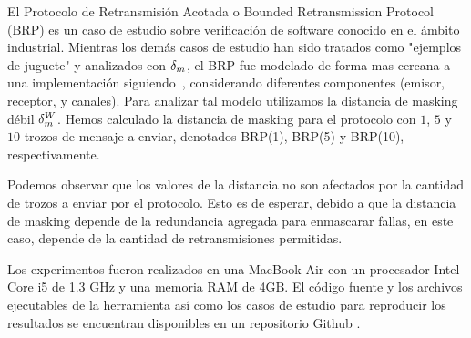 El Protocolo de Retransmisión Acotada o Bounded Retransmission Protocol (BRP) es un caso de estudio sobre verificación de software conocido en el ámbito industrial. Mientras los demás casos de estudio han sido tratados como "ejemplos de juguete" y analizados con $\delta_{m}$, el BRP fue modelado de forma mas cercana a una implementación siguiendo~\cite{GrooteP96}, considerando diferentes componentes (emisor, receptor, y canales). Para analizar tal modelo utilizamos la distancia de masking débil $\delta_{m}^W$.
Hemos calculado la distancia de masking para el protocolo con $1$, $5$ y $10$ trozos de mensaje a enviar, denotados BRP(1), BRP(5) y BRP(10), respectivamente. 

Podemos observar que los valores de la distancia no son afectados por la cantidad de trozos a enviar por el protocolo. Esto es de esperar, debido a que la distancia de masking depende de la redundancia agregada para enmascarar fallas, en este caso, depende de la cantidad de retransmisiones permitidas.

Los experimentos fueron realizados en una MacBook Air con un procesador Intel Core i5 de 1.3 GHz y una memoria RAM de 4GB. El código fuente y los archivos ejecutables de la herramienta así como los casos de estudio para reproducir los resultados se encuentran disponibles en un repositorio Github \cite{MaskD}.